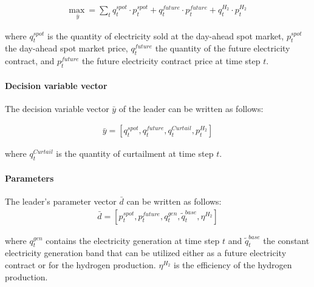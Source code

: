 \documentclass[review]{elsarticle}
\begin{document}
\begin{align}
\underset{\bar{y}}{\mathrm{max~}} = \sum_{t} q_{t}^{spot}\cdot p_{t}^{spot}+q_{t}^{future}\cdot p_{t}^{future}+q_{t}^{H_2}\cdot p_{t}^{H_2}
\end{align}

where $q_{t}^{spot}$ is the quantity of electricity sold at the day-ahead spot market, $p_{t}^{spot}$ the day-ahead spot market price, $q_{t}^{future}$ the quantity of the future electricity contract, and $p_{t}^{future}$ the future electricity contract price at time step $t$.

\paragraph{Decision variable vector} The decision variable vector $\bar{y}$ of the leader can be written as follows:

\begin{align}
\bar{y}=[q_{t}^{spot},q_{t}^{future},q_{t}^{Curtail}, p_{t}^{H_2}]
\end{align}

where $q_{t}^{Curtail}$ is the quantity of curtailment at time step $t$.

\paragraph{Parameters}
The leader's parameter vector $\bar{d}$ can be written as follows:
\begin{align}
\bar{d}=[p_{t}^{spot},p_{t}^{future},q_{t}^{gen}, \tilde{q}_{t}^{base}, \eta^{H_2}]
\end{align}

where $q_{t}^{gen}$ contains the electricity generation at time step $t$ and $\tilde{q}_{t}^{base}$ the constant electricity generation band that can be utilized either as a future electricity contract or for the hydrogen production. $\eta^{H_2}$ is the efficiency of the hydrogen production. 
\end{document}
